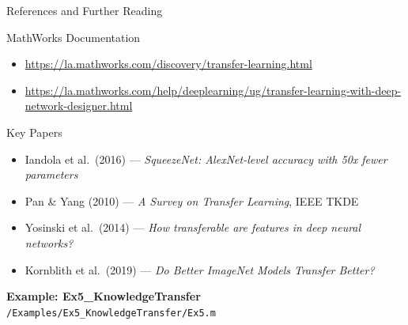 \documentclass[aspectratio=169,xcolor=dvipsnames]{beamer}
\begin{document}
\begin{frame}{References and Further Reading}
    \begin{exampleblock}{MathWorks Documentation}
        \begin{itemize}
            \item \url{https://la.mathworks.com/discovery/transfer-learning.html}
            \item \url{https://la.mathworks.com/help/deeplearning/ug/transfer-learning-with-deep-network-designer.html}
        \end{itemize}
    \end{exampleblock}
    \begin{block}{Key Papers}
        \begin{itemize}
            \item Iandola et al.\ (2016) — \textit{SqueezeNet: AlexNet-level accuracy with 50x fewer parameters}
            \item Pan \& Yang (2010) — \textit{A Survey on Transfer Learning}, IEEE TKDE
            \item Yosinski et al.\ (2014) — \textit{How transferable are features in deep neural networks?}
            \item Kornblith et al.\ (2019) — \textit{Do Better ImageNet Models Transfer Better?}
        \end{itemize}
    \end{block}
    \begin{center}
        \large\textbf{Example: Ex5\_KnowledgeTransfer} \\
        \small\texttt{/Examples/Ex5\_KnowledgeTransfer/Ex5.m}
    \end{center}
\end{frame}
\end{document}
